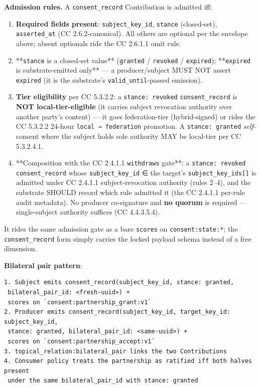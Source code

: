 \documentclass[11pt]{article}
\begin{document}
\textbf{Admission rules.} A \texttt{consent\_record} Contribution is admitted iff:

\begin{enumerate}\setlength\itemsep{0pt}
\item \textbf{Required fields present}: \texttt{subject\_key\_id}, \texttt{stance} (closed-set), \texttt{asserted\_at} (CC 2.6.2-canonical). All others are optional per the envelope above; absent optionals ride the CC 2.6.1.1 omit rule.
\item **\texttt{stance} is a closed-set value** (\texttt{granted} / \texttt{revoked} / \texttt{expired}); **\texttt{expired} is substrate-emitted only** — a producer/subject MUST NOT assert \texttt{expired} (it is the substrate's \texttt{valid\_until}-passed emission).
\item \textbf{Tier eligibility} per CC 5.3.2.2: a \texttt{stance: revoked} \texttt{consent\_record} is \textbf{NOT local-tier-eligible} (it carries subject revocation authority over another party's content) — it goes federation-tier (hybrid-signed) or rides the CC 5.3.2.2 24-hour \texttt{local → federation} promotion. A \texttt{stance: granted} \textit{self}-consent where the subject holds sole authority MAY be local-tier per CC 5.3.2.4.1.
\item **Composition with the CC 2.4.1.1 \texttt{withdraws} gate**: a \texttt{stance: revoked} \texttt{consent\_record} whose \texttt{subject\_key\_id} ∈ the target's \texttt{subject\_key\_ids[]} is admitted under CC 2.4.1.1 subject-revocation authority (rules 2–4), and the substrate SHOULD record which rule admitted it (the CC 2.4.1.1 per-rule audit metadata). No producer co-signature and \textbf{no quorum} is required — single-subject authority suffices (CC 4.4.3.5.4).
\end{enumerate}


It rides the same admission gate as a bare \texttt{scores} on \texttt{consent:state:*}; the \texttt{consent\_record} form simply carries the locked payload schema instead of a free dimension.


\textbf{Bilateral pair pattern}:


\begin{lstlisting}
1. Subject emits consent_record(subject_key_id, stance: granted,
 bilateral_pair_id: <fresh-uuid>) +
 scores on `consent:partnership_grant:v1`
2. Producer emits consent_record(subject_key_id, target_key_id: subject_key_id,
 stance: granted, bilateral_pair_id: <same-uuid>) +
 scores on `consent:partnership_accept:v1`
3. topical_relation:bilateral_pair links the two Contributions
4. Consumer policy treats the partnership as ratified iff both halves present
 under the same bilateral_pair_id with stance: granted
\end{lstlisting}
\end{document}
